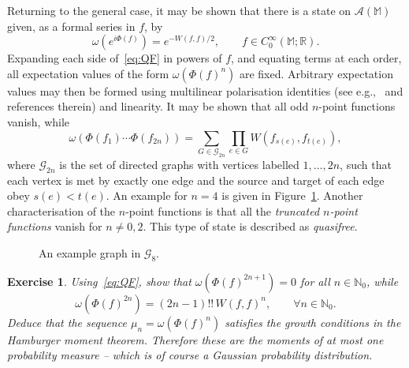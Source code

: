 \documentclass[12pt,a4paper]{article}
\newcommand{\1}{\mathds{1}}                         %
\newcommand{\NN}{\mathbb{N}}          %
\newcommand{\RR}{\mathbb{R}}           %
\newcommand{\MM}{\mathbb{M}}
\newcommand{\Ac}{{\mathcal{A}}}
\newcommand{\CoinX}[1]{C_0^\infty(#1)}
\newtheorem{exercise}[theorem]{Exercise}
\begin{document}
Returning to the general case, it may be shown that there is a state on $\Ac(\MM)$ given, as a formal series in $f$, by 
\begin{equation}\label{eq:QF}
\omega (e^{i\Phi(f)}) = e^{-W(f,f)/2},\qquad f\in\CoinX{\MM;\RR}.
\end{equation}
Expanding each side of~\eqref{eq:QF} in powers of $f$, and equating terms at each order, all expectation values of the form $\omega(\Phi(f)^n)$ are fixed. Arbitrary expectation values may then be formed using multilinear polarisation identities (see e.g.,~\cite{Thomas:2014} and references therein) and linearity.
It may be shown that all odd $n$-point functions vanish, while
\[
\omega(\Phi(f_1)\cdots\Phi(f_{2n}))= \sum_{G\in\mathcal{G}_{2n}} \prod_{e\in G}
W(f_{s(e)},f_{t(e)}),
\]
where $\mathcal{G}_{2n}$ is the set of directed graphs with vertices labelled $1,\ldots,2n$, such that each vertex is met by exactly one edge and the source and target of each edge obey $s(e)<t(e)$. An example for $n=4$ is given in Figure~\ref{fig:qf}. Another characterisation of the $n$-point functions is that all the \emph{truncated $n$-point functions} vanish for $n\neq 0,2$.
This type of state is described as \emph{quasifree}.

\begin{figure}[t]
	\begin{center}
	\end{center}
	\caption{An example graph in $\mathcal{G}_8$.}\label{fig:qf}
\end{figure} 

\begin{exercise}
	Using~\eqref{eq:QF}, show that $\omega(\Phi(f)^{2n+1})=0$ for all $n\in\NN_0$, while 
	\[
	\omega(\Phi(f)^{2n}) = (2n-1)!!\, W(f,f)^n, \qquad\forall n\in\NN_0.
	\]
	Deduce that the sequence $\mu_n = \omega(\Phi(f)^n)$ satisfies the growth conditions in the Hamburger moment theorem. Therefore these are the moments of at most one probability measure -- which is of course a Gaussian probability distribution.
\end{exercise}
\end{document}
